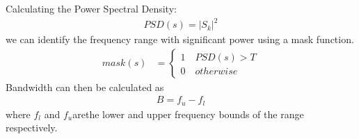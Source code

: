 \documentclass[12pt]{book}
\begin{document}
\begin{enumerate}
Calculating the Power Spectral Density: 
\begin{align}
PSD(s)=\lvert S_k \rvert^2 
\label{eq:psd}
\end{align}
we can identify the frequency range with significant power using a mask function. 
\begin{align*}
mask(s) &=
\begin{cases}
 1 \quad PSD(s) > T\\
0 \quad otherwise
\end{cases}
\end{align*}
Bandwidth can then be calculated as
\begin{align*}
B = f_u - f_l
\end{align*}
where $f_l $ and $f_u $arethe lower and upper frequency bounds of the range  respectively.

\end{enumerate}
\end{document}

